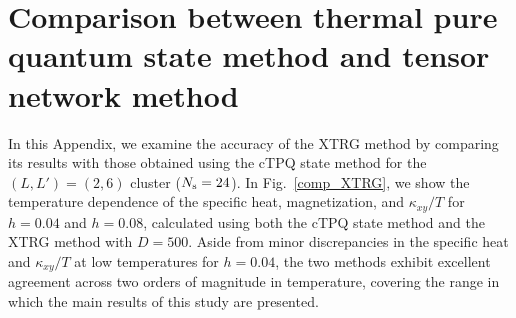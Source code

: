 \documentclass[twocolumn,superscriptaddress,showpacs, longbibliography, aps, prx]{revtex4-2}
\begin{document}
\section{Comparison between thermal pure quantum state method and tensor network method}
\label{app:XTRGcTPQ}
In this Appendix, we examine the accuracy of the XTRG method by comparing its results with those obtained using the cTPQ state method for the $(L, L') = (2, 6)$ cluster ($N_{\rm s}=24$). 
In Fig.~\ref{comp_XTRG}, we show the temperature dependence of the specific heat, magnetization, and $\kappa_{xy}/T$ for $h=0.04$ and $h=0.08$, calculated using both the cTPQ state method and the XTRG method with $D=500$. 
Aside from minor discrepancies in the specific heat and $\kappa_{xy}/T$ at low temperatures for $h=0.04$, the two methods exhibit excellent agreement across two orders of magnitude in temperature, covering the range in which the main results of this study are presented. 
\end{document}
